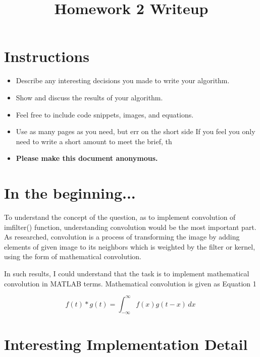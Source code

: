 \date{}

\title{\vspace{-1cm}Homework 2 Writeup}



\maketitle
\vspace{-3cm}
\thispagestyle{fancy}

\section*{Instructions}
\begin{itemize}
  \item Describe any interesting decisions you made to write your algorithm.
  \item Show and discuss the results of your algorithm.
  \item Feel free to include code snippets, images, and equations.
  \item Use as many pages as you need, but err on the short side If you feel you only need to write a short amount to meet the brief, th
  
  \item \textbf{Please make this document anonymous.}
\end{itemize}

\section*{In the beginning...}

To understand the concept of the question, as to implement convolution of imfilter() function, understanding convolution would be the most important part. As researched, convolution is a process of transforming the image by adding elements of given image to its neighbors which is weighted by the filter or kernel, using the form of mathematical convolution. 

In such results, I could understand that the task is to implement mathematical convolution in MATLAB terms. Mathematical convolution is given as Equation 1

\begin{equation}
f(t) * g(t) =  \int_{-\infty}^{\infty} f(x)g(t-x) \,dx \
\label{eq:one}
\end{equation}

\section*{Interesting Implementation Detail}

